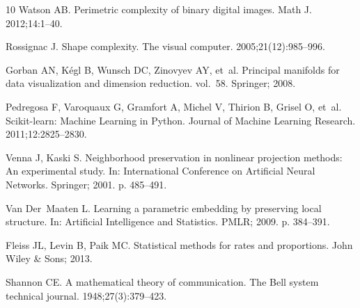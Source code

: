 \documentclass[10pt]{article}
\begin{document}
{\begin{thebibliography}{10}
Watson AB.
\newblock Perimetric complexity of binary digital images.
\newblock Math J. 2012;14:1--40.

Rossignac J.
\newblock Shape complexity.
\newblock The visual computer. 2005;21(12):985--996.

Gorban AN, K{\'e}gl B, Wunsch DC, Zinovyev AY, et~al.
\newblock Principal manifolds for data visualization and dimension reduction.
  vol.~58.
\newblock Springer; 2008.

Pedregosa F, Varoquaux G, Gramfort A, Michel V, Thirion B, Grisel O, et~al.
\newblock Scikit-learn: Machine Learning in {P}ython.
\newblock Journal of Machine Learning Research. 2011;12:2825--2830.

Venna J, Kaski S.
\newblock Neighborhood preservation in nonlinear projection methods: An
  experimental study.
\newblock In: International Conference on Artificial Neural Networks. Springer;
  2001. p. 485--491.

Van Der~Maaten L.
\newblock Learning a parametric embedding by preserving local structure.
\newblock In: Artificial Intelligence and Statistics. PMLR; 2009. p. 384--391.

Fleiss JL, Levin B, Paik MC.
\newblock Statistical methods for rates and proportions.
\newblock John Wiley \& Sons; 2013.

Shannon CE.
\newblock A mathematical theory of communication.
\newblock The Bell system technical journal. 1948;27(3):379--423.

\end{thebibliography}

}

% 	
% 	
\end{document}
